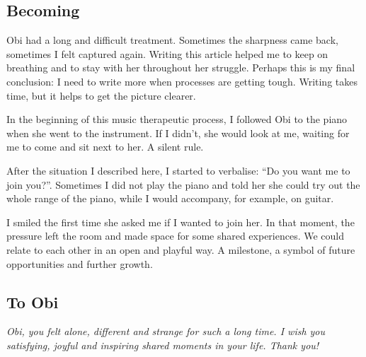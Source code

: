 \documentclass[authordate, empirical]{jote-new-article}
\begin{document}
\begin{itemize}
\end{itemize}





\subsection{Becoming}

Obi had a long and difficult treatment. Sometimes the sharpness came back, sometimes I felt captured again. Writing this article helped me to keep on breathing and to stay with her throughout her struggle. Perhaps this is my final conclusion: I need to write more when processes are getting tough. Writing takes time, but it helps to get the picture clearer.







In the beginning of this music therapeutic process, I followed Obi to the piano when she went to the instrument. If I didn't, she would look at me, waiting for me to come and sit next to her. A silent rule.



After the situation I described here, I started to verbalise: “Do you want me to join you?”. Sometimes I did not play the piano and told her she could try out the whole range of the piano, while I would accompany, for example, on guitar.



I smiled the first time she asked me if I wanted to join her. In that moment, the pressure left the room and made space for some shared experiences. We could relate to each other in an open and playful way. A milestone, a symbol of future opportunities and further growth.







\subsection{To Obi}

{\emph{Obi, you felt alone, different and strange for such a long time. I wish you satisfying, joyful and inspiring shared moments in your life. Thank you!}}
\end{document}

